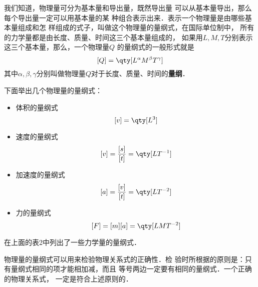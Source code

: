 我们知道，物理量可分为基本量和导出量，既然导出量
可以从基本量导出，那么每个导出量一定可以用基本量的某
种组合表示出来．表示一个物理量是由哪些基本量组成和怎
样组成的式子，叫做这个物理量的量纲式，在国际单位制中，
所有的力学量都是由长度、质量、时间这三个基本量组成的，
如果用$L,M,T$分别表示这三个基本量，那么，一个物理量$Q$
的量纲式的一般形式就是
\[[Q]=\qty[L^{\alpha}M^{\beta}T^{\gamma}]\]
其中$\alpha, \beta, \gamma$分别叫做物理量$Q$对于长度、质量、时间的\textbf{量纲}．

下面举出几个物理量的量纲式：
\begin{itemize}
    \item 体积的量纲式
    \[[v]=\qty[L^3]  \]
    \item 速度的量纲式
    \[[v]=\frac{[s]}{[t]}=\qty[LT^{-1}]  \] 
    \item 加速度的量纲式
    \[ [a]=\frac{[v]}{[t]}=\qty[LT^{-2}] \]
    \item 力的量纲式
    \[ [F]=[m][a]=\qty[LMT^{-2}] \]
\end{itemize}

在上面的表2中列出了一些力学量的量纲式．

物理量的量纲式可以用来检验物理关系式的正确性．检
验时所根据的原则是：只有量纲式相同的项才能相加减，而且
等号两边一定要有相同的量纲式．一个正确的物理关系式，
一定是符合上述原则的．



















